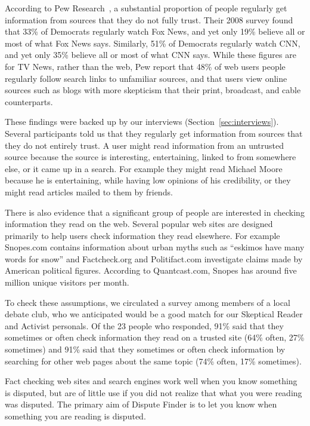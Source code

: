 \documentclass{www2010-accepted}
\newcommand{\todo}[1]{}
\begin{document}
According to Pew Research~\cite{PewResearch2008}, a substantial proportion of people regularly get information from sources that they do not fully trust. Their 2008 survey found that 33\% of Democrats regularly watch Fox News, and yet only 19\% believe all or most of what Fox News says. Similarly, 51\% of Democrats regularly watch CNN, and yet only 35\% believe all or most of what CNN says. While these figures are for TV News, rather than the web, Pew report that 48\% of web users people regularly follow search links to unfamiliar sources, and that users view online sources such as blogs with more skepticism that their print, broadcast, and cable counterparts. 

These findings were backed up by our interviews (Section~\ref{sec:interviews}). Several participants told us that they regularly get information from sources that they do not entirely trust. A user might read information from an untrusted source because the source is interesting, entertaining, linked to from somewhere else, or it came up in a search. For example they might read Michael Moore because he is entertaining, while having low opinions of his credibility, or they might read articles mailed to them by friends. 

\todo{Talk about people reading from a wide range of sources.}

There is also evidence that a significant group of people are interested in checking information they read on the web. Several popular web sites are designed primarily to help users check information they read elsewhere. For example Snopes.com contains information about urban myths such as ``eskimos have many words for snow'' and Factcheck.org and Politifact.com investigate claims made by American political figures. According to Quantcast.com, Snopes has around five million unique visitors per month.

To check these assumptions, we circulated a survey among members of a local debate club, who we anticipated would be a good match for our Skeptical Reader and Activist personals. Of the 23 people who responded, 91\% said that they sometimes or often check information they read on a trusted site (64\% often, 27\% sometimes) and 91\% said that they sometimes or often check information by searching for other web pages about the same topic (74\% often, 17\% sometimes).

\todo{Talk about our survey}

Fact checking web sites and search engines work well when you know something is disputed, but are of little use if you did not realize that what you were reading was disputed. The primary aim of Dispute Finder is to let you know when something you are reading is disputed.
\end{document}
